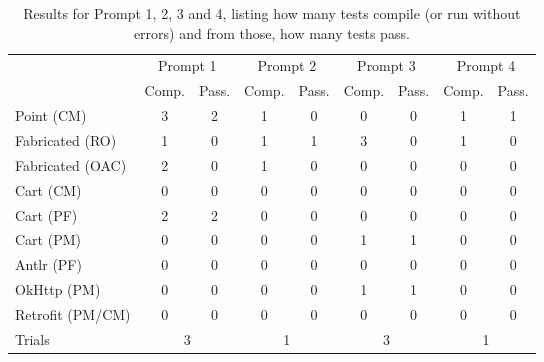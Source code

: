 
\begin{table}[t]
    \centering
    \begin{tabular}{@{\extracolsep{\fill}} l*{8}{c}} \toprule
                      & \multicolumn{2}{c}{Prompt 1} & \multicolumn{2}{c}{Prompt 2} & \multicolumn{2}{c}{Prompt 3} & \multicolumn{2}{c}{Prompt 4}\\
                      & Comp. & Pass. & Comp. & Pass. & Comp. & Pass. & Comp. & Pass. \\
    \midrule
    Point (CM)       & 3 & 2 & 1 & 0 & 0 & 0 & 1 & 1 \\
    Fabricated (RO)  & 1 & 0 & 1 & 1 & 3 & 0 & 1 & 0 \\
    Fabricated (OAC) & 2 & 0 & 1 & 0 & 0 & 0 & 0 & 0 \\
    Cart (CM)        & 0 & 0 & 0 & 0 & 0 & 0 & 0 & 0 \\
    Cart (PF)        & 2 & 2 & 0 & 0 & 0 & 0 & 0 & 0 \\
    Cart (PM)        & 0 & 0 & 0 & 0 & 1 & 1 & 0 & 0 \\
    Antlr (PF)       & 0 & 0 & 0 & 0 & 0 & 0 & 0 & 0 \\
    OkHttp (PM)      & 0 & 0 & 0 & 0 & 1 & 1 & 0 & 0 \\
    Retrofit (PM/CM) & 0 & 0 & 0 & 0 & 0 & 0 & 0 & 0 \\
    \midrule
    Trials    & \multicolumn{2}{c}{3} & \multicolumn{2}{c}{1} & \multicolumn{2}{c}{3} & \multicolumn{2}{c}{1} \\
    \bottomrule
    \end{tabular}
    \caption{Results for Prompt 1, 2, 3 and 4, listing how many tests compile (or run without errors) and from those, how many tests pass.\label{tab:results:rq3t1}}
\end{table}


